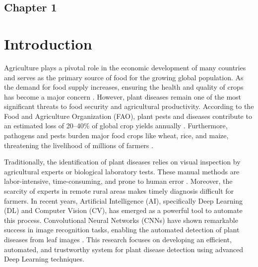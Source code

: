 \begin{center}
    \section*{\fontsize{20}{20}\selectfont Chapter 1}
\end{center}
\vspace{10mm}
\section{Introduction}

Agriculture plays a pivotal role in the economic development of many countries and serves as the primary source of food for the growing global population. As the demand for food supply increases, ensuring the health and quality of crops has become a major concern \cite{fao2017future}. However, plant diseases remain one of the most significant threats to food security and agricultural productivity. According to the Food and Agriculture Organization (FAO), plant pests and diseases contribute to an estimated loss of 20--40\% of global crop yields annually \cite{strange2005plant}. Furthermore, pathogens and pests burden major food crops like wheat, rice, and maize, threatening the livelihood of millions of farmers \cite{savary2019global}.

Traditionally, the identification of plant diseases relies on visual inspection by agricultural experts or biological laboratory tests. These manual methods are labor-intensive, time-consuming, and prone to human error \cite{barbedo2018factors}. Moreover, the scarcity of experts in remote rural areas makes timely diagnosis difficult for farmers. In recent years, Artificial Intelligence (AI), specifically Deep Learning (DL) and Computer Vision (CV), has emerged as a powerful tool to automate this process. Convolutional Neural Networks (CNNs) have shown remarkable success in image recognition tasks, enabling the automated detection of plant diseases from leaf images \cite{lecun2015deep}. This research focuses on developing an efficient, automated, and trustworthy system for plant disease detection using advanced Deep Learning techniques.

